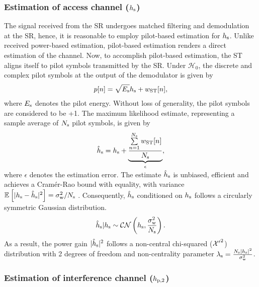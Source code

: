 \subsubsection{Estimation of access channel ($h_{\text{s}}$)}
The signal received from the SR undergoes matched filtering and demodulation at the SR, hence, it is reasonable to employ pilot-based estimation for $h_{\text{s}}$. Unlike received power-based estimation, pilot-based estimation renders a direct estimation of the channel. Now, to accomplish pilot-based estimation, the ST aligns itself to pilot symbols transmitted by the SR. Under $\mathcal H_0$, the discrete and complex pilot symbols at the output of the demodulator is given by \cite{Gifford08} 
\begin{align}
p[n] = \sqrt{E_{\text{s}}} h_{\text{s}} + w_{\text{ST}}[n], 
\label{eq_IS:pilot_sig}
\end{align}
where $E_{\text{s}}$ denotes the pilot energy. Without loss of generality, the pilot symbols are considered to be +1. The maximum likelihood estimate, representing a sample average of $N_{\text{s}}$ pilot symbols, is given by \cite{Gifford05}
\begin{align}
\hat{h}_{\text{s}} = h_{\text{s}} + \smash[b]{\underbrace{\frac{\sum\limits^{N_{\text{s}}}_{n=1} w_{\text{ST}}[n]}{N_{\text{s}}}}_{\epsilon}},
\label{eq_IS:pilot_MLE}
\end{align}\\[-0.00em]
where $\epsilon$ denotes the estimation error. 
The estimate $\hat{h}_{\text{s}}$ is unbiased, efficient and achieves a Cram\'er-Rao bound with equality, with variance ${\mathbb E}_{}\left[ |h_{\text{s}} -\hat{h}_{\text{s}}|^2 \right] = \sigma^2_{\text{w}}/N_{\text{s}}$ \cite{Gifford08}. Consequently, $\hat{h}_{\text{s}}$ conditioned on $h_{\text{s}}$ follows a circularly symmetric Gaussian distribution.
\begin{align}
\hat{h}_{\text{s}}|h_{\text{s}} \sim \mathcal{CN}\left( h_{\text{s}},\frac{\sigma^2_{\text{w}}}{N_{\text{s}}} \right).
\label{eq_IS:ehs} 
\end{align}
As a result, the power gain $|\hat{h}_{\text{s}}|^2$ follows a non-central chi-squared ($\ncchi2$) distribution with 2 degrees of freedom and non-centrality parameter $\lambda_{\text{s}} = \frac{N_{\text{s}} |h_{\text{s}}|^2}{\sigma^2_{\text{w}}}$.  

\subsubsection{Estimation of interference channel ($h_{\text{p,2}}$)}


